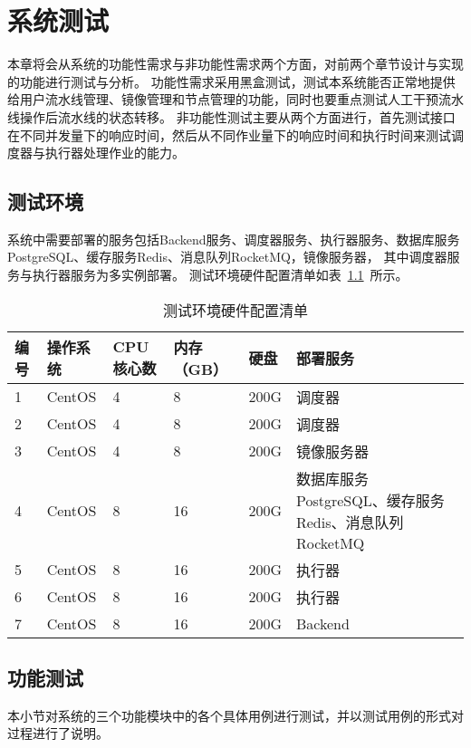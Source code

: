 
\chapter{系统测试}
本章将会从系统的功能性需求与非功能性需求两个方面，对前两个章节设计与实现的功能进行测试与分析。
功能性需求采用黑盒测试，测试本系统能否正常地提供给用户流水线管理、镜像管理和节点管理的功能，同时也要重点测试人工干预流水线操作后流水线的状态转移。
非功能性测试主要从两个方面进行，首先测试接口在不同并发量下的响应时间，然后从不同作业量下的响应时间和执行时间来测试调度器与执行器处理作业的能力。

\section{测试环境}
系统中需要部署的服务包括Backend服务、调度器服务、执行器服务、数据库服务PostgreSQL、缓存服务Redis、消息队列RocketMQ，镜像服务器，
其中调度器服务与执行器服务为多实例部署。
测试环境硬件配置清单如表~\ref{tab:测试环境硬件配置清单}~所示。

\begin{table}[ht]
  \centering
  \caption{测试环境硬件配置清单}
  \label{tab:测试环境硬件配置清单}
  \renewcommand{\arraystretch}{1.5}
  \begin{tabular}{|p{1cm}|p{1.5cm}|p{1cm}|p{1cm}|p{1cm}|p{6cm}|}
  \hline
  编号 & 操作系统 & CPU核心数 & 内存（GB）& 硬盘 & 部署服务 \\ \hline
  1 & CentOS & 4 & 8 & 200G & 调度器 \\ \hline
  2 & CentOS & 4 & 8 & 200G & 调度器 \\ \hline
  
  3 & CentOS & 4 & 8 & 200G & 镜像服务器 \\ \hline
  4 & CentOS & 8 & 16 & 200G & 数据库服务PostgreSQL、缓存服务Redis、消息队列RocketMQ \\ \hline
  5 & CentOS & 8 & 16 & 200G & 执行器 \\ \hline
  6 & CentOS & 8 & 16 & 200G & 执行器 \\ \hline
  7 & CentOS & 8 & 16 & 200G & Backend \\ \hline
  \end{tabular}
\end{table}


\section{功能测试}
本小节对系统的三个功能模块中的各个具体用例进行测试，并以测试用例的形式对过程进行了说明。

